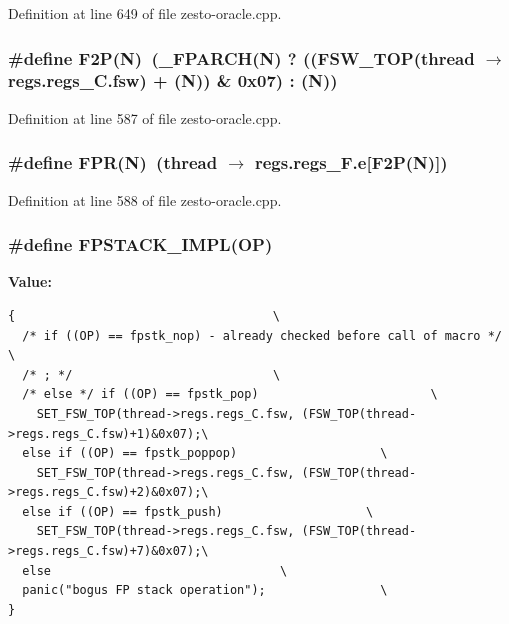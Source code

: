 Definition at line 649 of file zesto-oracle.cpp.
\subsubsection[{F2P}]{\setlength{\rightskip}{0pt plus 5cm}\#define F2P(N)~(\_\-FPARCH(N) ? ((FSW\_\-TOP(thread $\rightarrow$ regs.regs\_\-C.fsw) + (N)) \& 0x07) : (N))}\label{zesto-oracle_8cpp_9adbd7a2d18e1ad0c7ae0fe923acad93}




Definition at line 587 of file zesto-oracle.cpp.
\subsubsection[{FPR}]{\setlength{\rightskip}{0pt plus 5cm}\#define FPR(N)~(thread $\rightarrow$ regs.regs\_\-F.e[F2P(N)])}\label{zesto-oracle_8cpp_fcb75f93887802ec859d1129462e2bc7}




Definition at line 588 of file zesto-oracle.cpp.
\subsubsection[{FPSTACK\_\-IMPL}]{\setlength{\rightskip}{0pt plus 5cm}\#define FPSTACK\_\-IMPL(OP)}\label{zesto-oracle_8cpp_a751a02ae08302c577ec12f2ca780b81}


\textbf{Value:}

\begin{Code}\begin{verbatim}{                                    \
  /* if ((OP) == fpstk_nop) - already checked before call of macro */                        \
  /* ; */                            \
  /* else */ if ((OP) == fpstk_pop)                        \
    SET_FSW_TOP(thread->regs.regs_C.fsw, (FSW_TOP(thread->regs.regs_C.fsw)+1)&0x07);\
  else if ((OP) == fpstk_poppop)                    \
    SET_FSW_TOP(thread->regs.regs_C.fsw, (FSW_TOP(thread->regs.regs_C.fsw)+2)&0x07);\
  else if ((OP) == fpstk_push)                    \
    SET_FSW_TOP(thread->regs.regs_C.fsw, (FSW_TOP(thread->regs.regs_C.fsw)+7)&0x07);\
  else                                \
  panic("bogus FP stack operation");                \
}
\end{verbatim}
\end{Code}


